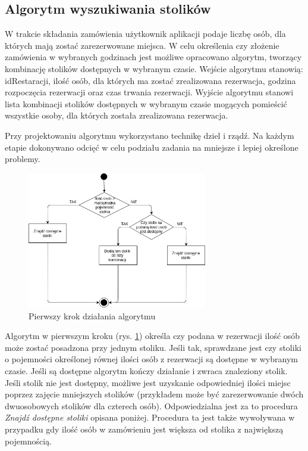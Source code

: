 \documentclass{article}
\begin{document}
\newpage
\subsection{Algorytm wyszukiwania stolików}
W trakcie składania zamówienia użytkownik aplikacji podaje liczbę osób, dla których mają zostać zarezerwowane miejsca. W celu określenia czy złożenie zamówienia w wybranych godzinach jest możliwe opracowano algorytm, tworzący kombinację stolików dostępnych w wybranym czasie. Wejście algorytmu stanowią:
idRestaracji,
ilość osób, dla których ma zostać zrealizowana rezerwacja,
godzina rozpoczęcia rezerwacji oraz
czas trwania rezerwacji.
Wyjście algorytmu stanowi lista kombinacji stolików dostępnych w wybranym czasie mogących pomieścić wszystkie osoby, dla których została zrealizowana rezerwacja. 

Przy projektowaniu algorytmu wykorzystano technikę dziel i rządź. Na każdym etapie dokonywano odcięć w celu podziału zadania na mniejsze i lepiej określone problemy.

\begin{figure}[h]
\centering
	\includegraphics[width=0.70\textwidth]{algo1.jpg}
	\caption[caption]{Pierwszy krok działania algorytmu}
	\label{fig:alg1}
\end{figure}

Algorytm w pierwszym kroku (rys. \ref{fig:alg1}) określa czy podana w rezerwacji ilość osób może zostać posadzona przy jednym stoliku. Jeśli tak, sprawdzane jest czy stoliki o pojemności określonej równej ilości osób z rezerwacji są dostępne w wybranym czasie. Jeśli są dostępne algorytm kończy działanie i zwraca znaleziony stolik. Jeśli stolik nie jest dostępny, możliwe jest uzyskanie odpowiedniej ilości miejsc poprzez zajęcie mniejszych stolików (przykładem może być zarezerwowanie dwóch dwuosobowych stolików dla czterech osób). Odpowiedzialna jest za to procedura \textit{Znajdź dostępne stoliki} opisana poniżej. Procedura ta jest także wywoływana w przypadku gdy ilość osób w zamówieniu jest większa od stolika z największą pojemnością.
\end{document}

